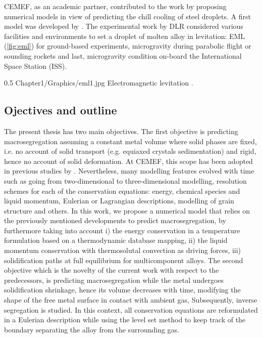 CEMEF, as an academic partner, contributed to the work by proposing numerical models in view of predicting the chill cooling of steel droplets. 
A first model was developed by \citet{rivaux_simulation_2011}. 
The experimental work by DLR considered various facilities and environments to set a droplet of molten alloy in levitation: 
EML (\cref{fig:eml}) for ground-based experiments, 
microgravity during parabolic flight or sounding rockets and last, microgravity condition on-board the International Space Station (ISS).
\begin{figureth}
{0.5}
{Chapter1/Graphics/eml1.jpg}
{Electromagnetic levitation \citep{dlr_electomagnetic_2014}.}
\label{fig:eml}
\end{figureth}
%
\subsection{Ojectives and outline}
The present thesis has two main objectives. 
The first objective is predicting macrosegregation assuming a constant metal volume where solid phases are fixed, i.e. no account of solid 
transport (e.g. equiaxed crystals sedimentation) and rigid, hence no account of solid deformation. At CEMEF, this scope has been adopted in previous 
studies by \citet{gouttebroze_modelisation_2005, liu_finite_2005, mosbah_multiple_2008, rivaux_simulation_2011, carozzani_developpement_2012}.
Nevertheless, many modelling features evolved with time such as going from two-dimensional to three-dimensional modelling, resolution schemes
for each of the conservation equations: energy, chemical species and liquid momentum, Eulerian or Lagrangian descriptions, 
modelling of grain structure and others.
In this work, we propose a numerical model that relies on the previously mentioned developments
to predict macrosegregation, by furthermore taking into account
i) the energy conservation in a temperature formulation based on a thermodynamic database mapping,
ii) the liquid momentum conservation with thermosolutal convection as driving forces, %
iii) solidification paths at full equilibrium for multicomponent alloys. 
The second objective which is the novelty of the current work with respect to the predecessors,
is predicting macrosegregation while the metal undergoes solidification shrinkage, hence
its volume decreases with time, modifying the shape of the free metal surface in contact with ambient gas,
Subsequently, inverse segregation is studied. In this context, all conservation equations are reformulated 
in a Eulerian description while using the level set method to keep 
track of the boundary separating the alloy from the surrounding gas. 

